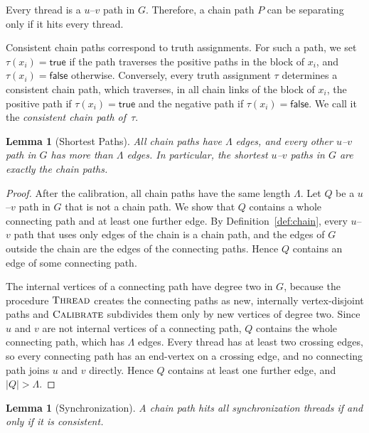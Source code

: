 \documentclass[a4paper,fleqn]{cas-sc}
\numberwithin{equation}{section}
\theoremstyle{definition}
\theoremstyle{plain}
\newtheorem{lemma}[definition]{Lemma}
\theoremstyle{remark}
\begin{document}
Every thread is a $u$--$v$ path in $G$.
Therefore, a chain path $P$ can be separating only if it hits every thread.

Consistent chain paths correspond to truth assignments.
For such a path, we set $\tau(x_i)=\mathsf{true}$ if the path traverses the positive paths in the block of $x_i$, and $\tau(x_i)=\mathsf{false}$ otherwise.
Conversely, every truth assignment $\tau$ determines a consistent chain path, which traverses, in all chain links of the block of $x_i$, the positive path if $\tau(x_i)=\mathsf{true}$ and the negative path if $\tau(x_i)=\mathsf{false}$.
We call it the \emph{consistent chain path of~$\tau$}.

\begin{lemma}[Shortest Paths]
\label{lem:chain-paths}
All chain paths have $\Lambda$ edges, and every other $u$--$v$ path in $G$ has more than $\Lambda$ edges.
In particular, the shortest $u$--$v$ paths in $G$ are exactly the chain paths.
\end{lemma}

\begin{proof}
After the calibration, all chain paths have the same length $\Lambda$.
Let $Q$ be a $u$--$v$ path in $G$ that is not a chain path.
We show that $Q$ contains a whole connecting path and at least one further edge.
By Definition~\ref{def:chain}, every $u$--$v$ path that uses only edges of the chain is a chain path, and the edges of $G$ outside the chain are the edges of the connecting paths.
Hence $Q$ contains an edge of some connecting path.

The internal vertices of a connecting path have degree two in $G$, because the procedure $\textsc{Thread}$ creates the connecting paths as new, internally vertex-disjoint paths and $\textsc{Calibrate}$ subdivides them only by new vertices of degree two.
Since $u$ and $v$ are not internal vertices of a connecting path, $Q$ contains the whole connecting path, which has $\Lambda$ edges.
Every thread has at least two crossing edges, so every connecting path has an end-vertex on a crossing edge, and no connecting path joins $u$ and $v$ directly.
Hence $Q$ contains at least one further edge, and $|Q| > \Lambda$.
\end{proof}

\begin{lemma}[Synchronization]
\label{lem:synchronization}
A chain path hits all synchronization threads if and only if it is consistent.
\end{lemma}
\end{document}
